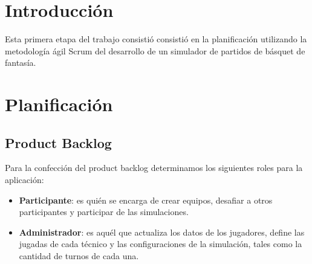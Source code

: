 \section{Introducción}
\indent \indent Esta primera etapa del trabajo consistió consistió en la planificación utilizando la metodología ágil Scrum del desarrollo de un simulador de partidos de básquet de fantasía.


\section{Planificación}

\subsection{Product Backlog}
\indent Para la confección del product backlog determinamos los siguientes roles para la aplicación:
\begin{itemize}
\item \textbf{Participante}: es quién se encarga de crear equipos, desafiar a otros participantes y participar de las simulaciones.
\item \textbf{Administrador}: es aquél que actualiza los datos de los jugadores, define las jugadas de cada técnico y las configuraciones de la simulación, tales como la cantidad de turnos de cada una.
\end{itemize}


